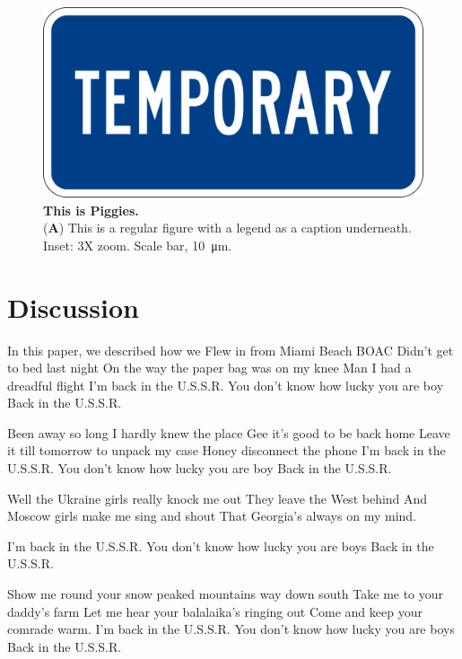 \begin{figure}[ht]
\centering
\includegraphics[width=1\linewidth]{Figures/temp.png}
\caption{\textbf{This is Piggies.}\\
(\textbf{A}) This is a regular figure with a legend as a caption underneath. Inset: 3X zoom. Scale bar, \SI{10}{\micro\meter}.}
\label{fig:piggies}
\end{figure}

\section*{Discussion}\label{s:discussion}

In this paper, we described how we Flew in from Miami Beach BOAC
Didn't get to bed last night
On the way the paper bag was on my knee
Man I had a dreadful flight
I’m back in the U.S.S.R.
You don't know how lucky you are boy
Back in the U.S.S.R.

Been away so long I hardly knew the place
Gee it's good to be back home
Leave it till tomorrow to unpack my case
Honey disconnect the phone
I'm back in the U.S.S.R.
You don't know how lucky you are boy
Back in the U.S.S.R.

Well the Ukraine girls really knock me out
They leave the West behind
And Moscow girls make me sing and shout
That Georgia's always on my mind.

I'm back in the U.S.S.R.
You don't know how lucky you are boys
Back in the U.S.S.R.

Show me round your snow peaked mountains way down south
Take me to your daddy's farm
Let me hear your balalaika’s ringing out
Come and keep your comrade warm.
I'm back in the U.S.S.R. 
You don’t know how lucky you are boys
Back in the U.S.S.R.


